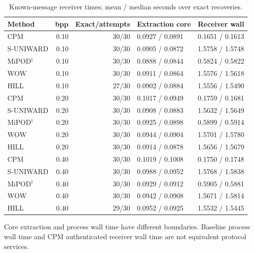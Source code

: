 \documentclass[journal]{IEEEtran}
\renewcommand{\arraystretch}{1.2}
\renewcommand{\arraystretch}{1.0}
\theoremstyle{definition}
\theoremstyle{game}
\renewcommand{\arraystretch}{1.5}
\begin{document}
\begin{table}[!t]
\centering\footnotesize
\caption{Known-message receiver times; mean / median seconds over exact recoveries.}
\label{tab:hsm-fresh-receiver}
\setlength{\tabcolsep}{4pt}\renewcommand{\arraystretch}{1.15}
\begin{tabular}{lrrll}
\toprule
Method & bpp & Exact/attempts & Extraction core & Receiver wall\\
\midrule
CPM & 0.10 & 30/30 & 0.0927 / 0.0891 & 0.1651 / 0.1613\\
S-UNIWARD & 0.10 & 30/30 & 0.0905 / 0.0872 & 1.5758 / 1.5748\\
MiPOD$^\dagger$ & 0.10 & 30/30 & 0.0888 / 0.0844 & 0.5824 / 0.5822\\
WOW & 0.10 & 30/30 & 0.0911 / 0.0864 & 1.5576 / 1.5618\\
HILL & 0.10 & 27/30 & 0.0902 / 0.0884 & 1.5556 / 1.5490\\
CPM & 0.20 & 30/30 & 0.1017 / 0.0949 & 0.1759 / 0.1681\\
S-UNIWARD & 0.20 & 30/30 & 0.0908 / 0.0883 & 1.5632 / 1.5649\\
MiPOD$^\dagger$ & 0.20 & 30/30 & 0.0925 / 0.0898 & 0.5899 / 0.5914\\
WOW & 0.20 & 30/30 & 0.0944 / 0.0904 & 1.5701 / 1.5780\\
HILL & 0.20 & 30/30 & 0.0914 / 0.0878 & 1.5656 / 1.5679\\
CPM & 0.40 & 30/30 & 0.1019 / 0.1008 & 0.1750 / 0.1748\\
S-UNIWARD & 0.40 & 30/30 & 0.0988 / 0.0952 & 1.5768 / 1.5838\\
MiPOD$^\dagger$ & 0.40 & 30/30 & 0.0929 / 0.0912 & 0.5905 / 0.5881\\
WOW & 0.40 & 30/30 & 0.0942 / 0.0908 & 1.5671 / 1.5814\\
HILL & 0.40 & 29/30 & 0.0952 / 0.0925 & 1.5532 / 1.5445\\
\bottomrule
\end{tabular}
\par\smallskip\parbox{.97\textwidth}{\footnotesize Core extraction and process wall time have different boundaries. Baseline process wall time and CPM authenticated receiver wall time are not equivalent protocol services.}
\end{table}
\end{document}
